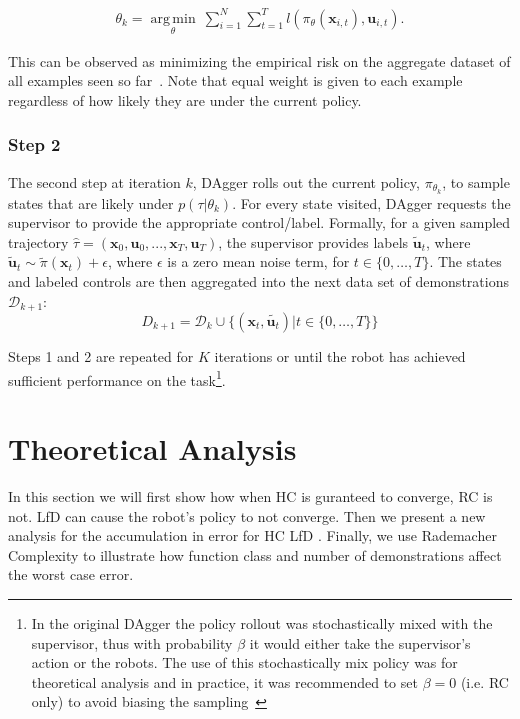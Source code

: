 \documentclass[10pt, conference]{ieeeconf}      %
\DeclareMathOperator*{\argmin}{arg\,min}
\newcommand{\bu}{\mathbf{u}}
\newcommand{\bx}{\mathbf{x}}
\newcommand{\ns}{HC LfD }
\begin{document}
 \vspace{-1ex}
\begin{align}\label{eq:super_objj}
\theta_{k} = \underset{\theta}{\argmin} \: \sum_{i=1}^{N} \sum_{t=1}^T  l(\pi_{\theta}(\bx_{i,t}),\bu_{i,t}).
\end{align}

This can be observed as minimizing the empirical risk on the aggregate dataset of all examples seen so far~\cite{scholkopf2002learning}.  Note that equal weight is given to each example regardless of how likely they are under the current policy.
 

 \subsubsection{Step 2}
The second step at iteration $k$, DAgger rolls out the current policy, $\pi_{\theta_{k}}$, to sample states that are likely under $p(\tau|\theta_{k})$.  For every state visited, DAgger requests the supervisor to provide the appropriate control/label. Formally, for a given sampled trajectory  $\hat{\tau} = (\bx_0,\bu_0,...,\bx_T,\bu_T )$, the supervisor provides labels $\tilde{\bu}_t$, where $\tilde{\bu}_t \sim \tilde{\pi}(\bx_t) + \epsilon$, where $\epsilon$ is a  zero mean noise term, for $t\in \{0, \ldots, T\}$.
The states and labeled controls are then aggregated into the next data set of demonstrations $\mathcal{D}_{k+1}$:
$$D_{k+1}=\mathcal{D}_k \cup \{(\bx_t,\tilde{\bu_t})|t\in\{0,\ldots,T\}\} $$

Steps 1 and 2 are repeated for $K$ iterations or until the robot has achieved sufficient performance on the
task\footnote{In the original DAgger the policy rollout was stochastically mixed with the supervisor, thus with
    probability $\beta$ it would either take the supervisor's action or the robots. The use of this stochastically mix
    policy was for theoretical analysis and in practice, it was recommended to set $\beta = 0$ (i.e. RC only) to avoid biasing the
sampling~\cite{NIPS2014_5421,ross2010reduction}}.


 

\section{Theoretical Analysis}
In this section we will first show how when HC is guranteed to converge, RC is not.  LfD can cause the robot's policy to not converge. Then we present a new analysis for the accumulation in error for  \ns.  Finally, we use Rademacher Complexity to illustrate how function class and number of demonstrations affect the worst case error. 
\end{document}
